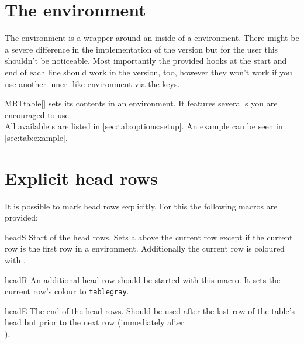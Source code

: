 \section{The  environment}\label{sec:tab:table}%
The  environment is a wrapper around an  inside of
a  environment. There might be a severe difference in the
implementation of the  version but for the user this shouldn't be
noticeable. Most importantly the provided hooks at the start and end of each
line should work in the  version, too, however they won't work if you
use another inner -like environment via the  keys.

\begin{describeenv}{MRTtable}[]
   sets its contents in an  environment. It
  features several s you are encouraged to use.
  \\[\parskip]
  All available s are listed in \autoref{sec:tab:options:setup}. An
  example can be seen in \autoref{sec:tab:example}.
\end{describeenv}

\section{Explicit head rows}\label{sec:tab:explicit}%
It is possible to mark head rows explicitly. For this the following macros are
provided:

\begin{describemacro}{headS}%
  Start of the head rows. Sets a  above the current row except if the
  current row is the first row in a  environment. Additionally
  the current row is coloured with .
\end{describemacro}%

\begin{describemacro}{headR}%
  An additional head row should be started with this macro. It sets the current
  row's colour to \texttt{tablegray}.
\end{describemacro}%

\begin{describemacro}{headE}%
  The end of the head rows. Should be used after the last row of the table's
  head but prior to the next row (immediately after \texttt{\string\\}).
\end{describemacro}%

